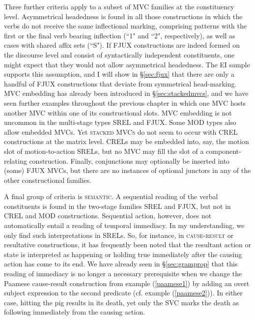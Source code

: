 Three further criteria apply to a subset of MVC families at the constituency level. Asymmetrical headedness is found in all those constructions in which the verbs do not receive the same inflectional marking, comprising patterns with the first or the final verb bearing inflection (``1" and ``2", respectively), as well as cases with shared affix sets (``S"). If FJUX constructions are indeed formed on the discourse level and consist of syntactically independent constituents, one might expect that they would not allow asymmetrical headedness. The EI sample supports this assumption, and I will show in §\ref{sec:fjux} that there are only a handful of FJUX constructions that deviate from symmetrical head-marking. MVC embedding has already been introduced in §\ref{sec:stackedmvcs}, and we have seen further examples throughout the previous chapter in which one MVC hosts another MVC within one of its constructional slots. MVC embedding is not uncommon in the multi-stage types SREL and FJUX. Some MOD types also allow embedded MVCs. Yet \textsc{stacked MVCs} do not seem to occur with CREL constructions at the matrix level. CRELs may be embedded into, say, the motion slot of motion-to-action SRELs, but no MVC may fill the slot of a component-relating construction. Finally, conjunctions may optionally be inserted into (some) FJUX MVCs, but there are no instances of optional junctors in any of the other constructional families.

A final group of criteria is \textsc{semantic}. A sequential reading of the verbal constituents is found in the two-stage families SREL and FJUX, but not in CREL and MOD constructions. Sequential action, however, does not automatically entail a reading of temporal immediacy. In my understanding, we only find such interpretations in SRELs. So, for instance, in \textsc{cause-result} or resultative constructions, it has frequently been noted that the resultant action or state is interpreted as happening or holding true immediately after the causing action has come to its end. We have already seen in §\ref{sec:gramprop} that this reading of immediacy is no longer a necessary prerequisite when we change the Paamese cause-result construction from example (\ref{paamese1}) by adding an overt subject expression to the second predicate (cf. example (\ref{paamese2})). In either case, hitting the pig results in its death, yet only the SVC marks the death as following immediately from the causing action. 

